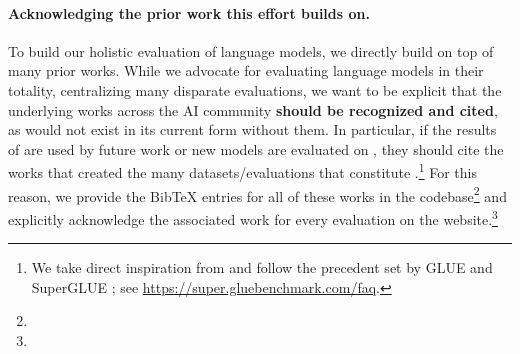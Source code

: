 \paragraph{Acknowledging the prior work this effort builds on.}
To build our holistic evaluation of language models, we directly build on top of many prior works.
While we advocate for evaluating language models in their totality, \ie centralizing many disparate evaluations, we want to be explicit that the underlying works across the AI community \textbf{should be recognized and cited}, as \benchmarkname would not exist in its current form without them.
In particular, if the results of \benchmarkname are used by future work or new models are evaluated on \benchmarkname, they should cite the works that created the many datasets/evaluations that constitute \benchmarkname.\footnote{We take direct inspiration from and follow the precedent set by GLUE and SuperGLUE \citep{wang2019superglue, wang2019glue}; see \url{https://super.gluebenchmark.com/faq}.} 
For this reason, we provide the BibTeX entries for all of these works in the codebase\footnote{\githubUrl{}} and explicitly acknowledge the associated work for every evaluation on the website.\footnote{\benchmarkUrl{}}
